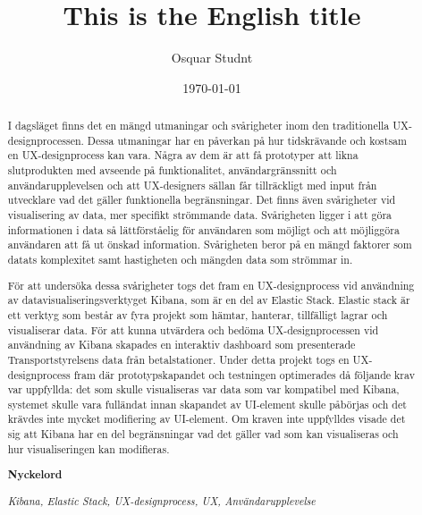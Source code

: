 \documentclass[12pt]{kththesis}
\title{This is the English title}
\author{Osquar Studnt}
\date{\today}
\begin{document}
\frontmatter
\afterpage{\null\newpage}


\afterpage{\null\newpage}

\begin{otherlanguage}{swedish}
  \begin{abstract}
\afterpage{\null\newpage}

I dagsläget finns det en mängd utmaningar och svårigheter inom den traditionella UX-designprocessen. Dessa utmaningar har en påverkan på hur tidskrävande och kostsam en UX-designprocess kan vara. Några av dem är att få prototyper att likna slutprodukten med avseende på funktionalitet, användargränssnitt och användarupplevelsen och att UX-designers sällan får tillräckligt med input från utvecklare vad det gäller funktionella begränsningar. Det finns även svårigheter vid visualisering av data, mer specifikt strömmande data. Svårigheten ligger i att göra informationen i data så lättförståelig för användaren som möjligt och att möjliggöra användaren att få ut önskad information. Svårigheten beror på en mängd faktorer som datats komplexitet samt hastigheten och mängden data som strömmar in. 

För att undersöka dessa svårigheter togs det fram en UX-designprocess vid användning av datavisualiseringsverktyget Kibana, som är en del av Elastic Stack. Elastic stack är ett verktyg som består av fyra projekt som hämtar, hanterar, tillfälligt lagrar och visualiserar data. För att kunna utvärdera och bedöma UX-designprocessen vid användning av Kibana skapades en interaktiv dashboard som presenterade Transportstyrelsens data från betalstationer. Under detta projekt togs en UX-designprocess fram där prototypskapandet och testningen optimerades då följande krav var uppfyllda: det som skulle visualiseras var data som var kompatibel med Kibana, systemet skulle vara fulländat innan skapandet av UI-element skulle påbörjas och det krävdes inte mycket modifiering av UI-element. Om kraven inte uppfylldes visade det sig att Kibana har en del begränsningar vad det gäller vad som kan visualiseras och hur visualiseringen kan modifieras. 

\textbf{Nyckelord}

\textit{Kibana, Elastic Stack, UX-designprocess, UX, Användarupplevelse}

 \end{abstract}
\end{otherlanguage}
 
\end{document}

